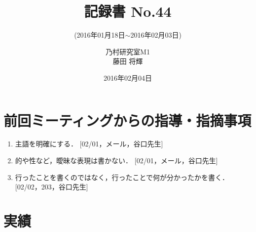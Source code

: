 \documentclass[fleqn, 14pt]{extarticle}
\subtitle{(2016年01月18日$\sim$2016年02月03日)}
\author{乃村研究室M1\\藤田 将輝}
\date{2016年02月04日}
\title{記録書 No.44}
\begin{document}
    \maketitle

    \section{前回ミーティングからの指導・指摘事項}
    \label{sec-1}
    \begin{enumerate}

        \item 主語を明確にする．
            \hfill
            [02/01，メール，谷口先生]

        \item 的や性など，曖昧な表現は書かない．
            \hfill
            [02/01，メール，谷口先生]

        \item 行ったことを書くのではなく，行ったことで何が分かったかを書く．
            \newline
            \hfill
            [02/02，203，谷口先生]


    \end{enumerate}

    \section{実績}
    \label{sec-2}
\end{document}
